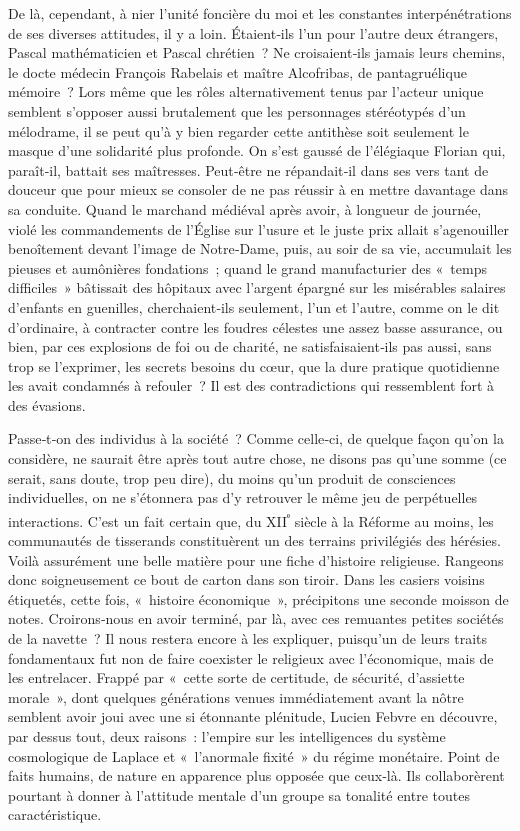 \documentclass[french,twoside]{book} %
\begin{document}
De là, cependant, à nier l’unité foncière du moi et les constantes inter­pénétrations de ses diverses attitudes, il y a loin. Étaient‑ils l’un pour l’autre deux étrangers, Pascal mathématicien et Pascal chrétien ? Ne croisaient‑ils jamais leurs chemins, le docte médecin François Rabelais et maître Alcofribas, de pantagruélique mémoire ? Lors même que les rôles alternativement tenus par l’acteur unique semblent s’opposer aussi brutalement que les personnages stéréotypés d’un mélodrame, il se peut qu’à y bien regarder cette antithèse soit seulement le masque d’une  
\label{p77} solidarité plus profonde. On s’est gaussé de l’élégiaque Florian qui, paraît‑il, battait ses maîtresses. Peut‑être ne répandait‑il dans ses vers tant de douceur que pour mieux se consoler de ne pas réussir à en mettre davan­tage dans sa conduite. Quand le marchand médiéval après avoir, à lon­gueur de journée, violé les commandements de l’Église sur l’usure et le juste prix allait s’agenouiller benoîtement devant l’image de Notre‑Dame, puis, au soir de sa vie, accumulait les pieuses et aumônières fondations ; quand le grand manufacturier des « temps difficiles » bâtissait des hôpi­taux avec l’argent épargné sur les misérables salaires d’enfants en gue­nilles, cherchaient‑ils seulement, l’un et l’autre, comme on le dit d’ordi­naire, à contracter contre les foudres célestes une assez basse assurance, ou bien, par ces explosions de foi ou de charité, ne satisfaisaient‑ils pas aussi, sans trop se l’exprimer, les secrets besoins du cœur, que la dure pratique quotidienne les avait condamnés à refouler ? Il est des contra­dictions qui ressemblent fort à des évasions.\par
Passe‑t‑on des individus à la société ? Comme celle‑ci, de quelque façon qu’on la considère, ne saurait être après tout autre chose, ne disons pas qu’une somme (ce serait, sans doute, trop peu dire), du moins qu’un produit de consciences individuelles, on ne s’étonnera pas d’y retrouver le même jeu de perpétuelles interactions. C’est un fait certain que, du XII\textsuperscript{ᵉ} siècle à la Réforme au moins, les communautés de tisserands constituèrent un des terrains privilégiés des hérésies. Voilà assurément une belle matière pour une fiche d’histoire religieuse. Rangeons donc soigneusement ce bout de carton dans son tiroir. Dans les casiers voisins étiquetés, cette fois, « histoire économique », précipitons une seconde moisson de notes. Croirons‑nous en avoir terminé, par là, avec ces remu­antes petites sociétés de la navette ? Il nous restera encore à les expliquer, puisqu’un de leurs traits fondamentaux fut non de faire coexister le religieux avec l’économique, mais de les entrelacer. Frappé par « cette sorte de certitude, de sécurité, d’assiette morale », dont quelques géné­rations venues immédiatement avant la nôtre semblent avoir joui avec une si étonnante plénitude, Lucien Febvre en découvre, par dessus tout, deux raisons : l’empire sur les intelligences du système cosmologique de Laplace et « l’anormale fixité » du régime monétaire. Point de faits humains, de nature en apparence plus opposée que ceux‑là. Ils collaborèrent pourtant à donner à l’attitude mentale d’un groupe sa tonalité entre toutes caractéristique.\par
\end{document}
